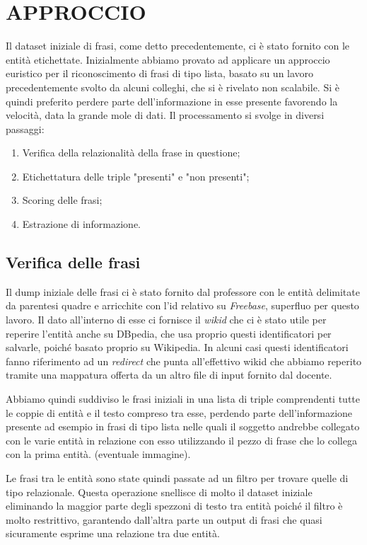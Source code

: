\documentclass[10pt,a4paper,twocolumn]{article}
\begin{document}
\section{APPROCCIO}

Il dataset iniziale di frasi, come detto precedentemente, ci è stato fornito con le entità etichettate. Inizialmente abbiamo provato ad applicare un approccio euristico per il riconoscimento di frasi di tipo lista, basato su un lavoro precedentemente svolto da alcuni colleghi, che si è rivelato non scalabile. Si è quindi preferito perdere parte dell'informazione in esse presente favorendo la velocità, data la grande mole di dati.
Il processamento si svolge in diversi passaggi:
\begin{enumerate}
\item Verifica della relazionalità della frase in questione;
\item Etichettatura delle triple "presenti" e "non presenti";
\item Scoring delle frasi;
\item Estrazione di informazione.
\end{enumerate}

\subsection{Verifica delle frasi}
Il dump iniziale delle frasi ci è stato fornito dal professore con le entità delimitate da parentesi quadre e arricchite con l'id relativo su \textit{Freebase}, superfluo per questo lavoro. Il dato all'interno di esse ci fornisce il \textit{wikid} che ci è stato utile per reperire l'entità anche su DBpedia, che usa proprio questi identificatori per salvarle, poiché basato proprio su Wikipedia. In alcuni casi questi identificatori fanno riferimento ad un \textit{redirect} che punta all'effettivo wikid che abbiamo reperito tramite una mappatura offerta da un altro file di input fornito dal docente.

Abbiamo quindi suddiviso le frasi iniziali in una lista di triple comprendenti tutte le coppie di entità e il testo compreso tra esse, perdendo parte dell'informazione presente ad esempio in frasi di tipo lista nelle quali il soggetto andrebbe collegato con le varie entità in relazione con esso utilizzando il pezzo di frase che lo collega con la prima entità. (eventuale immagine).

Le frasi tra le entità sono state quindi passate ad un filtro per trovare quelle di tipo relazionale. Questa operazione snellisce di molto il dataset iniziale eliminando la maggior parte degli spezzoni di testo tra entità poiché il filtro è molto restrittivo, garantendo dall'altra parte un output di frasi che quasi sicuramente esprime una relazione tra due entità.
\end{document}
